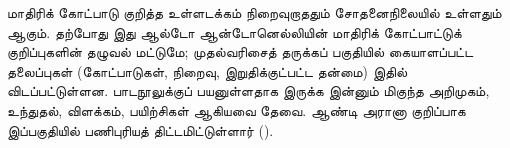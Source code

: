 \documentclass[../../include/open-logic-part]{subfiles}
\begin{document}


\begin{editorial}
  மாதிரிக் கோட்பாடு குறித்த உள்ளடக்கம் நிறைவுறாததும் சோதனைநிலையில்
  உள்ளதும் ஆகும். தற்போது இது ஆல்டோ ஆன்டோனெல்லியின் மாதிரிக் கோட்பாட்டுக்
  குறிப்புகளின் தழுவல் மட்டுமே; முதல்வரிசைத் தருக்கப் பகுதியில்
  கையாளப்பட்ட தலைப்புகள் (கோட்பாடுகள், நிறைவு, இறுதிக்குட்பட்ட தன்மை)
  இதில் விடப்பட்டுள்ளன. பாடநூலுக்குப் பயனுள்ளதாக இருக்க இன்னும் மிகுந்த
  அறிமுகம், உந்துதல், விளக்கம், பயிற்சிகள் ஆகியவை தேவை. ஆண்டி அரானா
  குறிப்பாக இப்பகுதியில் பணிபுரியத் திட்டமிட்டுள்ளார் ().
\end{editorial}





\OLEndPartHook
\end{document}
